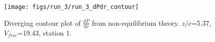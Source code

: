 \begin{figure}[H]
\centering
\texttt{[image: figs/run\_3/run\_3\_dPdr\_contour]}
\caption{Diverging contour plot of $\frac{d\bar{P}}{dr}$ from non-equilibrium theory. $z/c$=5.37, $V_{free}$=19.43, station 1.}
\label{fig:run_3_dPdr_contour}
\end{figure}


